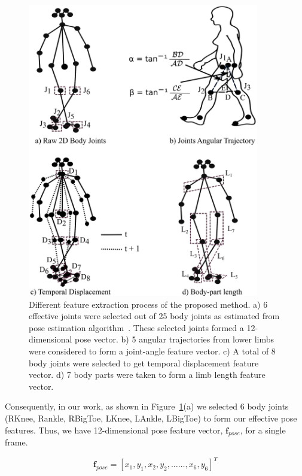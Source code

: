 \begin{figure}
	
	\centering 
	\includegraphics[width = 0.9\textwidth]{figures/extracted_features.eps}
	\caption[Different feature extraction process of the proposed method]
	{Different feature extraction process of the proposed method. a) 6 effective joints were selected out of 25 body joints as estimated from pose estimation algorithm~\cite{Cao_19}. These selected joints formed a 12-dimensional pose vector. b) 5 angular trajectories from lower limbs were considered to form a joint-angle feature vector. c) A total of 8 body joints were selected to get temporal displacement feature vector. d) 7 body parts were taken to form a limb length feature vector.\label{fig:extracted_features}
	}
\end{figure}

Consequently, in our work, as shown in Figure~\ref{fig:extracted_features}(a) we selected 6 body joints (RKnee, Rankle, RBigToe, LKnee, LAnkle, LBigToe) to form our effective pose features. Thus, we have 12-dimensional pose feature vector, $\textbf{f}_{pose}$, for a single frame. 

\begin{equation}
  \textbf {f}_{pose}= [x_1, y_1, x_2, y_2, \ldots\ldots, x_6, y_6]^T
\end{equation}

